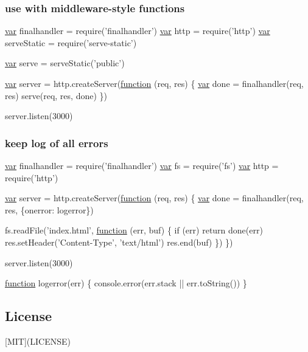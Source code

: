 \subsubsection*{use with middleware-\/style functions}


\begin{DoxyCode}
\hyperlink{018__def_8c_a335628f2e9085305224b4f9cc6e95ed5}{var} finalhandler = require(\textcolor{stringliteral}{'finalhandler'})
\hyperlink{018__def_8c_a335628f2e9085305224b4f9cc6e95ed5}{var} http = require('http')
\hyperlink{018__def_8c_a335628f2e9085305224b4f9cc6e95ed5}{var} serveStatic = require('serve-static')

\hyperlink{018__def_8c_a335628f2e9085305224b4f9cc6e95ed5}{var} serve = serveStatic('public')

\hyperlink{018__def_8c_a335628f2e9085305224b4f9cc6e95ed5}{var} server = http.createServer(\hyperlink{class_test_a51a683fa4fcec142ab1574e00a7b6860}{function} (req, res) \{
  \hyperlink{018__def_8c_a335628f2e9085305224b4f9cc6e95ed5}{var} done = finalhandler(req, res)
  serve(req, res, done)
\})

server.listen(3000)
\end{DoxyCode}


\subsubsection*{keep log of all errors}


\begin{DoxyCode}
\hyperlink{018__def_8c_a335628f2e9085305224b4f9cc6e95ed5}{var} finalhandler = require(\textcolor{stringliteral}{'finalhandler'})
\hyperlink{018__def_8c_a335628f2e9085305224b4f9cc6e95ed5}{var} fs = require('fs')
\hyperlink{018__def_8c_a335628f2e9085305224b4f9cc6e95ed5}{var} http = require('http')

\hyperlink{018__def_8c_a335628f2e9085305224b4f9cc6e95ed5}{var} server = http.createServer(\hyperlink{class_test_a51a683fa4fcec142ab1574e00a7b6860}{function} (req, res) \{
  \hyperlink{018__def_8c_a335628f2e9085305224b4f9cc6e95ed5}{var} done = finalhandler(req, res, \{onerror: logerror\})

  fs.readFile(\textcolor{stringliteral}{'index.html'}, \hyperlink{class_test_a51a683fa4fcec142ab1574e00a7b6860}{function} (err, buf) \{
    \textcolor{keywordflow}{if} (err) \textcolor{keywordflow}{return} done(err)
    res.setHeader(\textcolor{stringliteral}{'Content-Type'}, \textcolor{stringliteral}{'text/html'})
    res.end(buf)
  \})
\})

server.listen(3000)

\hyperlink{class_test_a51a683fa4fcec142ab1574e00a7b6860}{function} logerror(err) \{
  console.error(err.stack || err.toString())
\}
\end{DoxyCode}


\subsection*{License}

\mbox{[}M\+I\+T\mbox{]}(L\+I\+C\+E\+N\+S\+E) 